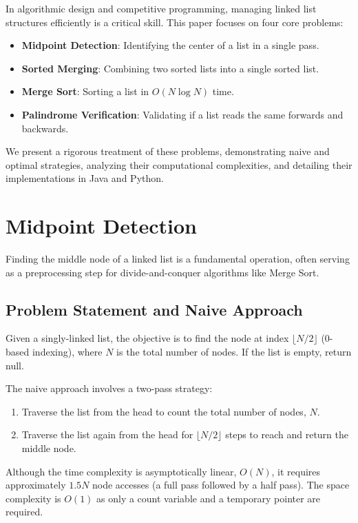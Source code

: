\documentclass[10pt,journal,compsoc,onecolumn]{IEEEtran}
\begin{document}
In algorithmic design and competitive programming, managing linked list structures efficiently is a critical skill. This paper focuses on four core problems:
\begin{itemize}
    \item \textbf{Midpoint Detection}: Identifying the center of a list in a single pass.
    \item \textbf{Sorted Merging}: Combining two sorted lists into a single sorted list.
    \item \textbf{Merge Sort}: Sorting a list in $O(N \log N)$ time.
    \item \textbf{Palindrome Verification}: Validating if a list reads the same forwards and backwards.
\end{itemize}
We present a rigorous treatment of these problems, demonstrating naive and optimal strategies, analyzing their computational complexities, and detailing their implementations in Java and Python.

\section{Midpoint Detection}
\label{sec:midpoint}
Finding the middle node of a linked list is a fundamental operation, often serving as a preprocessing step for divide-and-conquer algorithms like Merge Sort.

\subsection{Problem Statement and Naive Approach}
Given a singly-linked list, the objective is to find the node at index $\lfloor N/2 \rfloor$ (0-based indexing), where $N$ is the total number of nodes. If the list is empty, return null.

The naive approach involves a two-pass strategy:
\begin{enumerate}
    \item Traverse the list from the head to count the total number of nodes, $N$.
    \item Traverse the list again from the head for $\lfloor N/2 \rfloor$ steps to reach and return the middle node.
\end{enumerate}

Although the time complexity is asymptotically linear, $O(N)$, it requires approximately $1.5N$ node accesses (a full pass followed by a half pass). The space complexity is $O(1)$ as only a count variable and a temporary pointer are required.
\end{document}
